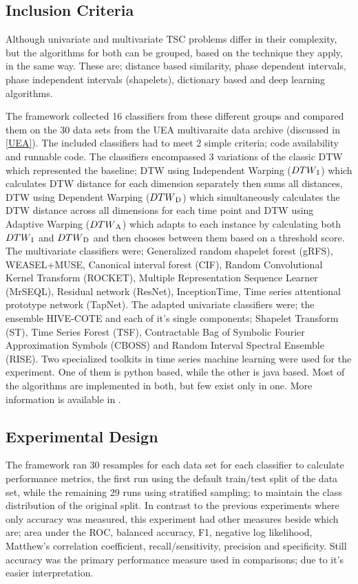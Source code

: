 \subsection{Inclusion Criteria}
\label{subsectionMultiBakeoffInclusion}
Although univariate and multivariate TSC problems differ in their complexity, but the algorithms for both can be grouped, based on the technique they apply, in the same way.
These are; distance based similarity, phase dependent intervals, phase independent intervals (shapelets), dictionary based and deep learning algorithms.

The framework collected 16 classifiers from these different groups and compared them on the 30 data sets from the UEA multivaraite data archive (discussed in \ref{UEA}).
The included classifiers had to meet 2 simple criteria; code availability and runnable code.
The classifiers encompassed 3 variations of the classic DTW which represented the baseline; DTW using Independent Warping ($DTW\textsubscript{I}$) which calculates DTW distance for each dimension separately then
sums all distances, DTW using Dependent Warping ($DTW\textsubscript{D}$) which simultaneously calculates the DTW distance across all dimensions for each time point and DTW using Adaptive Warping
($DTW\textsubscript{A}$) which adapts to each instance by calculating both $DTW\textsubscript{I}$ and $DTW\textsubscript{D}$ and then chooses between them based on a threshold score.
The multivariate classifiers were; Generalized random shapelet forest (gRFS), WEASEL+MUSE, Canonical interval forest (CIF), Random Convolutional Kernel Transform (ROCKET),
Multiple Representation Sequence Learner (MrSEQL), Residual network (ResNet), InceptionTime, Time series attentional prototype network (TapNet).
The adapted univariate classifiers were; the ensemble HIVE-COTE and each of it's single components; Shapelet Transform (ST), Time Series Forest (TSF), Contractable Bag of Symbolic Fourier Approximation Symbols (CBOSS)
and Random Interval Spectral Ensemble (RISE).
Two specialized toolkits in time series machine learning were used for the experiment. One of them is python based, while the other is java based.
Most of the algorithms are implemented in both, but few exist only in one. More information is available in \cite{ruiz2020great}.

\subsection{Experimental Design}
\label{subsectionMultiBakeoffExperiment}
The framework ran 30 resamples for each data set for each classifier to calculate performance metrics, the first run using the default train/test split of the data set, while the remaining 29 runs using
stratified sampling; to maintain the class distribution of the original split.
In contrast to the previous experiments where only accuracy was measured, this experiment had other measures beside which are; area under the ROC, balanced accuracy, F1, negative log likelihood,
Matthew’s correlation coefficient, recall/sensitivity, precision and specificity. Still accuracy was the primary performance measure used in comparisons; due to it's easier interpretation.

